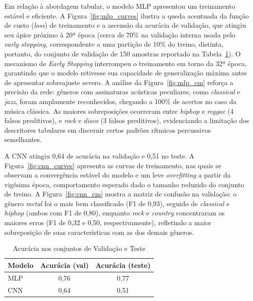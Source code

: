 \documentclass[conference]{IEEEtran}
\begin{document}
	Em relação à abordagem tabular, o modelo MLP apresentou um treinamento estável e eficiente. A Figura~\ref{fig:mlp_curves} ilustra a queda acentuada da função de custo (\textit{loss}) de treinamento e a ascensão da acurácia de validação, que atingiu seu ápice próximo à 20ª época (cerca de 70\% na validação interna usada pelo \textit{early stopping}, correspondente a uma partição de 10\% do treino, distinta, portanto, do conjunto de validação de 150 amostras reportado na Tabela~\ref{tab:resultados}). O mecanismo de \textit{Early Stopping} interrompeu o treinamento em torno da 32ª época, garantindo que o modelo retivesse sua capacidade de generalização máxima antes de apresentar sobreajuste severo. A análise da Figura~\ref{fig:mlp_cm} reforça a precisão da rede: gêneros com assinaturas acústicas peculiares, como \textit{classical} e \textit{jazz}, foram amplamente reconhecidos, chegando a 100\% de acertos no caso da música clássica. As maiores sobreposições ocorreram entre \textit{hiphop} e \textit{reggae} (4 falsos preditivos), e \textit{rock} e \textit{disco} (3 falsos preditivos), evidenciando a limitação dos descritores tabulares em discernir certos padrões rítmicos percussivos semelhantes.
	
	A CNN atingiu 0,64 de acurácia na validação e 0,51 no teste. A Figura~\ref{fig:cnn_curves} apresenta as curvas de treinamento, nas quais se observam a convergência estável do modelo e um leve \textit{overfitting} a partir da vigésima época, comportamento esperado dado o tamanho reduzido do conjunto de treino. A Figura~\ref{fig:cnn_cm} mostra a matriz de confusão na validação: o gênero \textit{metal} foi o mais bem classificado (F1 de 0,93), seguido de \textit{classical} e \textit{hiphop} (ambos com F1 de 0,80), enquanto \textit{rock} e \textit{country} concentraram os maiores erros (F1 de 0,32 e 0,50, respectivamente), refletindo a maior sobreposição de suas características com as dos demais gêneros.
	
	\begin{table}[h]
		\centering
		\caption{Acurácia nos conjuntos de Validação e Teste}
		\label{tab:resultados}
		\begin{tabular}{lcc}
			\toprule
			\textbf{Modelo} & \textbf{Acurácia (val)} & \textbf{Acurácia (teste)} \\
			\midrule
			MLP  & 0,76 & 0,77 \\
			CNN  & 0,64 & 0,51 \\
			\bottomrule
		\end{tabular}
	\end{table}
	
\end{document}
